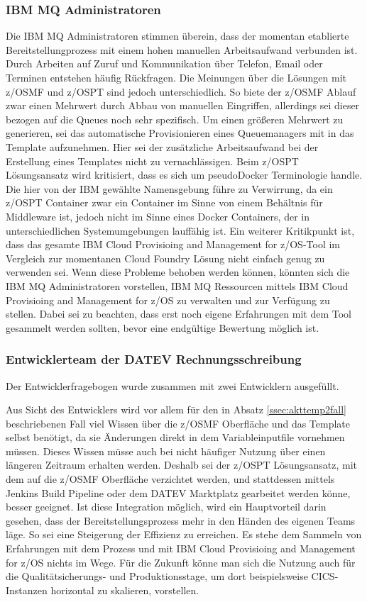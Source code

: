 \subsubsection{IBM MQ Administratoren}
Die IBM MQ Administratoren stimmen überein, dass der momentan etablierte Bereitstellungprozess mit einem hohen manuellen Arbeitsaufwand verbunden ist.
Durch Arbeiten auf Zuruf und Kommunikation über Telefon, Email oder Terminen entstehen häufig Rückfragen.
Die Meinungen über die Lösungen mit z/OSMF und z/OSPT sind jedoch unterschiedlich.
So biete der z/OSMF Ablauf zwar einen Mehrwert durch Abbau von manuellen Eingriffen, allerdings sei dieser bezogen auf die Queues noch sehr spezifisch.
Um einen größeren Mehrwert zu generieren, sei das automatische Provisionieren eines Queuemanagers mit in das Template aufzunehmen.
Hier sei der zusätzliche Arbeitsaufwand bei der Erstellung eines Templates nicht zu vernachlässigen.
Beim z/OSPT Lösungsansatz wird kritisiert, dass es sich  um \glqq pseudo\grqq Docker Terminologie handle.
Die hier von der IBM gewählte Namensgebung führe zu Verwirrung, da ein z/OSPT Container zwar ein Container im Sinne von einem Behältnis für Middleware ist, jedoch nicht im Sinne eines Docker Containers, der in unterschiedlichen Systemumgebungen lauffähig ist.
Ein weiterer Kritikpunkt ist, dass das gesamte \glqq IBM Cloud Provisioing and Management for z/OS\grqq-Tool im Vergleich zur momentanen Cloud Foundry Lösung nicht einfach genug zu verwenden sei. 
Wenn diese Probleme behoben werden können, könnten sich die IBM MQ Administratoren vorstellen, IBM MQ Ressourcen mittels \glqq IBM Cloud Provisioing and Management for z/OS\grqq{} zu verwalten und zur Verfügung zu stellen.
Dabei sei zu beachten, dass erst noch eigene Erfahrungen mit dem Tool gesammelt werden sollten, bevor eine endgültige Bewertung möglich ist.

\subsubsection{Entwicklerteam der DATEV Rechnungsschreibung}
Der Entwicklerfragebogen wurde zusammen mit zwei Entwicklern ausgefüllt.

Aus Sicht des Entwicklers wird vor allem für den in Absatz \ref{ssec:akttemp2fall} beschriebenen Fall viel Wissen über die z/OSMF Oberfläche und das Template selbst benötigt, da sie Änderungen direkt in dem Variableinputfile vornehmen müssen.
Dieses Wissen müsse auch bei nicht häufiger Nutzung über einen längeren Zeitraum erhalten werden.
Deshalb sei der z/OSPT Lösungsansatz, mit dem auf die z/OSMF Oberfläche verzichtet werden, und stattdessen mittels Jenkins Build Pipeline oder dem DATEV \glqq Marktplatz\grqq{} gearbeitet werden könne, besser geeignet.
Ist diese Integration möglich, wird ein Hauptvorteil darin gesehen, dass der Bereitstellungsprozess mehr in den Händen des eigenen Teams läge.
So sei eine Steigerung der Effizienz zu erreichen.
Es stehe dem Sammeln von Erfahrungen mit dem Prozess und mit \glqq IBM Cloud Provisioing and Management for z/OS\grqq{} nichts im Wege.
Für die Zukunft könne man sich die Nutzung auch für die Qualitätsicherungs- und Produktionsstage, um dort beispielsweise CICS-Instanzen horizontal zu skalieren, vorstellen.

